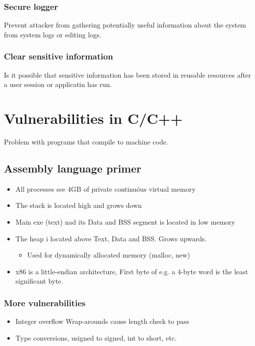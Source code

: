 \documentclass[course, english]{Notes}
\begin{document}
\subsubsection{Secure logger}
Prevent attacker from gathering potentially useful information about the system
from system logs or editing logs.

\subsubsection{Clear sensitive information}
Is it possible that sensitive information has been stored in reusable resources
after a user session or applicatin has run.


\section{Vulnerabilities in C/C++}
Problem with programs that compile to machine code. 
\subsection{Assembly language primer}
\begin{itemize}
	\item All processes see 4GB of private continuóus virtual memory
	\item The stack is located high and grows down
	\item Main exe (text) nad its Data and BSS segment is located in low
		memory
	\item The heap i located above Text, Data and BSS. Grows upwards.
		\begin{itemize}
			\item Used for dynamically allocated memory (malloc,
				new)
		\end{itemize}
	\item x86 is a little-endian architecture, First byte of e.g. a 4-byte
		word is the least significant byte.
\end{itemize}

\subsubsection{More vulnerabilities}
\begin{itemize}
	\item Integer overflow Wrap-arounds cause length check to pass
	\item Type conversions, usigned to signed, int to short, etc.
\end{itemize}
\end{document}
